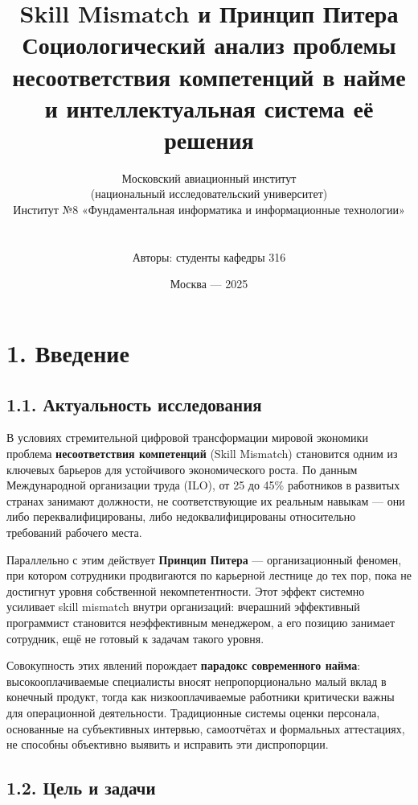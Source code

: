 \documentclass[
  russian,
  12pt,
]{report}
\title{Skill Mismatch и Принцип Питера\\
Социологический анализ проблемы несоответствия компетенций в найме и
интеллектуальная система её решения}
\author{Московский авиационный институт\\
(национальный исследовательский университет)\\
Институт №8 «Фундаментальная информатика и информационные технологии»\\
\strut \\
Авторы: студенты кафедры 316}
\date{Москва --- 2025}
\begin{document}
\maketitle

{
\setcounter{tocdepth}{1}
\tableofcontents
}
\chapter{1. Введение}\label{ux432ux432ux435ux434ux435ux43dux438ux435}

\section{1.1. Актуальность
исследования}\label{ux430ux43aux442ux443ux430ux43bux44cux43dux43eux441ux442ux44c-ux438ux441ux441ux43bux435ux434ux43eux432ux430ux43dux438ux44f}

В условиях стремительной цифровой трансформации мировой экономики
проблема \textbf{несоответствия компетенций} (Skill Mismatch) становится
одним из ключевых барьеров для устойчивого экономического роста. По
данным Международной организации труда (ILO), от 25 до 45\% работников в
развитых странах занимают должности, не соответствующие их реальным
навыкам --- они либо переквалифицированы, либо недоквалифицированы
относительно требований рабочего места.

Параллельно с этим действует \textbf{Принцип Питера} --- организационный
феномен, при котором сотрудники продвигаются по карьерной лестнице до
тех пор, пока не достигнут уровня собственной некомпетентности. Этот
эффект системно усиливает skill mismatch внутри организаций: вчерашний
эффективный программист становится неэффективным менеджером, а его
позицию занимает сотрудник, ещё не готовый к задачам такого уровня.

Совокупность этих явлений порождает \textbf{парадокс современного
найма}: высокооплачиваемые специалисты вносят непропорционально малый
вклад в конечный продукт, тогда как низкооплачиваемые работники
критически важны для операционной деятельности. Традиционные системы
оценки персонала, основанные на субъективных интервью, самоотчётах и
формальных аттестациях, не способны объективно выявить и исправить эти
диспропорции.

\section{1.2. Цель и
задачи}\label{ux446ux435ux43bux44c-ux438-ux437ux430ux434ux430ux447ux438}
\end{document}

